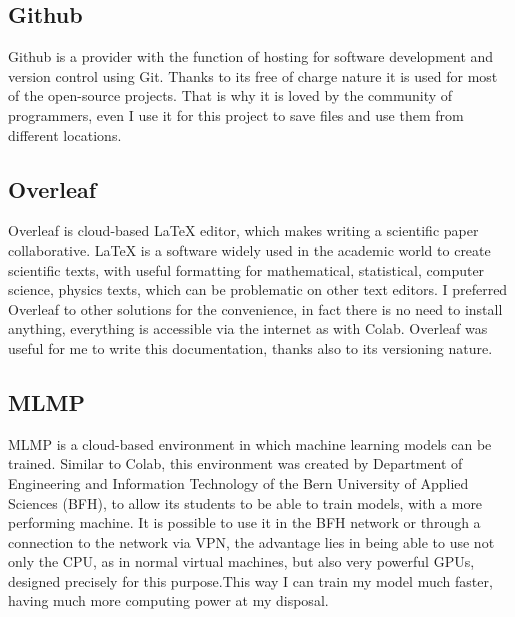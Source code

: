 \subsection{Github}
Github \cite{github_inc_github_nodate} is a provider with the function of hosting for software development and version control using Git.
Thanks to its free of charge nature it is used for most of the open-source projects.
That is why it is loved by the community of programmers, even I use it for this project to save files and use them from different locations.


\subsection{Overleaf}
Overleaf \cite{noauthor_overleaf_nodate} is cloud-based \LaTeX{} editor, which makes writing a scientific paper collaborative. \LaTeX{} is a software widely used in the academic world to create scientific texts, with useful formatting for mathematical, statistical, computer science, physics texts, which can be problematic on other text editors.
I preferred Overleaf to other solutions for the convenience, in fact there is no need to install anything, everything is accessible via the internet as with Colab.
Overleaf was useful for me to write this documentation, thanks also to its versioning nature.

\subsection{MLMP}
MLMP \cite{berner_fachhochschule_mlmp_nodate} is a cloud-based environment in which machine learning models can be trained. Similar to Colab, this environment was created by Department of Engineering and Information Technology of the Bern University of Applied Sciences (BFH), to allow its students to be able to train models, with a more performing machine. It is possible to use it in the BFH network or through a connection to the network via VPN, the advantage lies in being able to use not only the CPU, as in normal virtual machines, but also very powerful GPUs, designed precisely for this purpose.This way I can train my model much faster, having much more computing power at my disposal.

